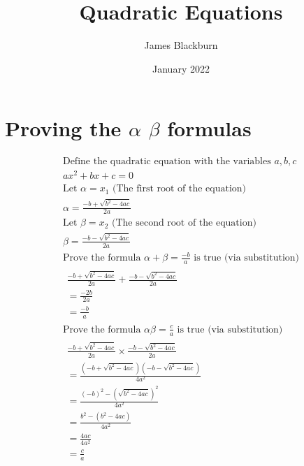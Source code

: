 \documentclass{article} %
\title{Quadratic Equations}
\author{James Blackburn}
\date{January 2022}
\begin{document}
\maketitle
\section{Proving the $\alpha$ $\beta$ formulas}
\begin{gather} 
\text{Define the quadratic equation with the variables } a, b, c\\
ax^2+bx+c = 0 \\
\text{Let } \alpha = x_1 \text{ (The first root of the equation)}\\
\alpha = \frac{-b + \sqrt{b^2-4ac}}{2a} \\
\text{Let } \beta = x_2 \text{ (The second root of the equation)}\\
\beta = \frac{-b - \sqrt{b^2-4ac}}{2a} \\
\text{Prove the formula } \alpha + \beta  = \frac{-b}{a} \text{ is true (via substitution)} \\ 
\begin{split}
 \frac{-b + \sqrt{b^2-4ac}}{2a} + \frac{-b - \sqrt{b^2-4ac}}{2a}\\ 
= \frac{-2b}{2a}\\ 
= \frac{-b}{a}
\end{split}
\\
\text{Prove the formula } \alpha\beta = \frac{c}{a}  \text{ is true (via substitution)} \\
\begin{split}
 \frac{-b + \sqrt{b^2-4ac}}{2a} \times \frac{-b - \sqrt{b^2-4ac}}{2a} \\
= \frac{(-b + \sqrt{b^2-4ac})(-b - \sqrt{b^2-4ac})}{4a^2} \\
= \frac{(-b)^2 - (\sqrt{b^2-4ac})^2}{4a^2}\\
= \frac{b^2 - (b^2-4ac)}{4a^2}\\
= \frac{4ac}{4a^2}\\
= \frac{c}{a}
\end{split}
\end{gather} 
\end{document}
